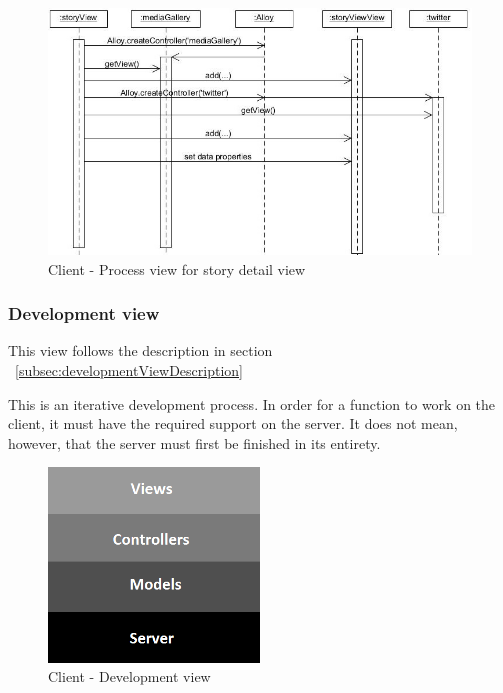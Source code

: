 \documentclass[11pt]{book}
\begin{document}
\begin{figure}[H]
      \centering
      \includegraphics[width=1.0\textwidth]{Figures/Architecture/Sequence/client/storyView.jpg}
      \caption{Client - Process view for story detail view}
      \label{fig:arch_client_process_storyDetail}
\end{figure}

\subsubsection{Development view}
This view follows the description in section ~\ref{subsec:developmentViewDescription}

This is an iterative development process. In order for a function to work on the client, it must have the required support on the server. It does not mean, however, that the server must first be finished in its entirety.

\begin{figure}[H]
      \centering
      \includegraphics[width=0.5\textwidth]{Figures/Architecture/clientDevelopmentView.png}
      \caption{Client - Development view}
      \label{fig:arch_client_development}
\end{figure}
\end{document}
